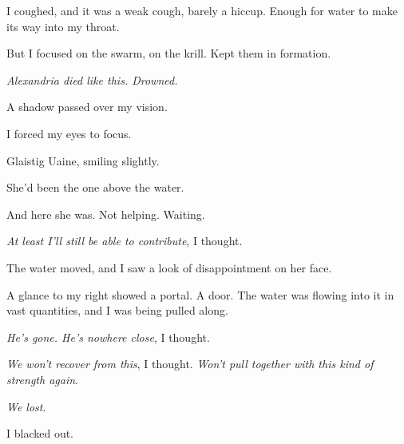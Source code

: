 I coughed, and it was a weak cough, barely a hiccup.  Enough for water to make its way into my throat.



But I focused on the swarm, on the krill.  Kept them in formation.



\emph{Alexandria died like this.  Drowned.}



A shadow passed over my vision.



I forced my eyes to focus.



Glaistig Uaine, smiling slightly.



She'd been the one above the water.



And here she was.  Not helping.  Waiting.



\emph{At least I'll still be able to contribute}, I thought.



The water moved, and I saw a look of disappointment on her face.



A glance to my right showed a portal.  A door.  The water was flowing into it in vast quantities, and I was being pulled along.



\emph{He's gone.  He's nowhere close}, I thought.



\emph{We won't recover from this}, I thought.  \emph{Won't pull together with this kind of strength again}.



\emph{We lost}.



I blacked out.





